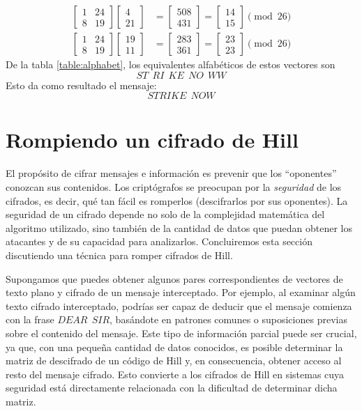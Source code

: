 \begin{examplebox}{}{}
\begin{align*}
        \begin{bmatrix} 1 & 24 \\ 8 & 19 \end{bmatrix} \begin{bmatrix} 4 \\ 21 \end{bmatrix} & = \begin{bmatrix} 508 \\ 431 \end{bmatrix} = \begin{bmatrix} 14 \\ 15 \end{bmatrix} \pmod{26} \\
        \begin{bmatrix} 1 & 24 \\ 8 & 19 \end{bmatrix} \begin{bmatrix} 19 \\ 11 \end{bmatrix} & = \begin{bmatrix} 283 \\ 361 \end{bmatrix} = \begin{bmatrix} 23 \\ 23 \end{bmatrix} \pmod{26}
    \end{align*}
    De la tabla \ref{table:alphabet}, los equivalentes alfabéticos de estos vectores son
    $$ST ~~ RI ~~ KE ~~ NO ~~ WW$$
    Esto da como resultado el mensaje:
    $$STRIKE ~~ NOW$$
\end{examplebox}

\section*{Rompiendo un cifrado de Hill}

El propósito de cifrar mensajes e información es prevenir que los “oponentes” conozcan sus contenidos. Los criptógrafos se preocupan por la \emph{seguridad} de los cifrados, es decir, qué tan fácil es romperlos (descifrarlos por sus oponentes). La seguridad de un cifrado depende no solo de la complejidad matemática del algoritmo utilizado, sino también de la cantidad de datos que puedan obtener los atacantes y de su capacidad para analizarlos. Concluiremos esta sección discutiendo una técnica para romper cifrados de Hill.

Supongamos que puedes obtener algunos pares correspondientes de vectores de texto plano y cifrado de un mensaje interceptado. Por ejemplo, al examinar algún texto cifrado interceptado, podrías ser capaz de deducir que el mensaje comienza con la frase $DEAR ~~ SIR$, basándote en patrones comunes o suposiciones previas sobre el contenido del mensaje. Este tipo de información parcial puede ser crucial, ya que, con una pequeña cantidad de datos conocidos, es posible determinar la matriz de descifrado de un código de Hill y, en consecuencia, obtener acceso al resto del mensaje cifrado. Esto convierte a los cifrados de Hill en sistemas cuya seguridad está directamente relacionada con la dificultad de determinar dicha matriz.

